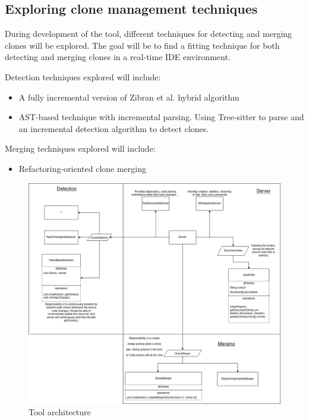 \documentclass[12pt]{article}
\begin{document}
\subsection{Exploring clone management techniques}

During development of the tool, different techniques for detecting and merging clones will
be explored. The goal will be to find a fitting technique for both detecting and merging
clones in a real-time IDE environment.

Detection techniques explored will include:

\begin{itemize}
	\item A fully incremental version of Zibran et al. hybrid
	      algorithm\cite{Zibran_real_time_search}
	\item AST-based technique with incremental parsing. Using Tree-sitter to parse and an
	      incremental detection algorithm to detect clones.
\end{itemize}

Merging techniques explored will include:

\begin{itemize}
	\item Refactoring-oriented clone merging\cite{RefactoringOrientedClonesAndMerging}
\end{itemize}

\begin{figure}
	\includegraphics[width=\textwidth]{images/ToolArchitecture.png}
	\caption{Tool architecture}
	\label{fig:architecture}
\end{figure}
\end{document}
